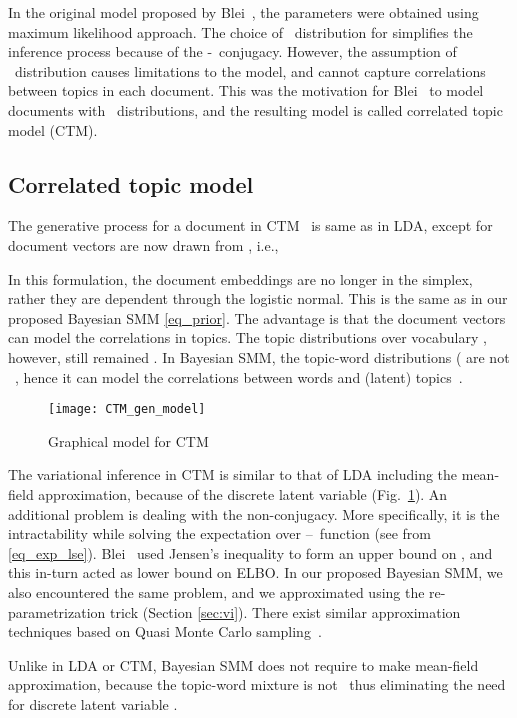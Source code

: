 \documentclass[journal]{IEEEtran}
\newcommand{\lse}{--}      \newcommand{\Dir}{}
\newcommand{\Dis}{}
\newcommand{\Mul}{}
\newcommand{\Gau}{}
\begin{document}
In the original model proposed by Blei~\cite{Blei:2003:LDA}, the parameters  were obtained using maximum likelihood approach. The choice of \Dir~distribution for   simplifies the inference process because of the \Dir-\Mul~conjugacy. However, the assumption of \Dir~distribution causes limitations to the model, and  cannot capture correlations between topics in each document.
This was the motivation for Blei~\cite{Blei:2005:CTM} to model documents with \Gau~distributions, and the resulting model is called correlated topic model (CTM).

\subsection{Correlated topic model}
The generative process for a document in CTM~\cite{Blei:2005:CTM} is same as in 
LDA, except for document vectors are now drawn from \Gau, i.e.,

In this formulation, the document embeddings  are no longer in the 
 simplex, rather they are dependent through the logistic normal. This 
is the same as in our proposed Bayesian SMM \eqref{eq_prior}. The advantage is 
that the document vectors can model the correlations in topics. The topic 
distributions over vocabulary , however, still remained \Dis.
In Bayesian SMM, the topic-word distributions ( are not \Dis~, hence 
it can model the correlations between words and (latent) 
topics~\cite{Blei:2005:CTM}.
\begin{figure}[t!]
	\centering
	\texttt{[image: CTM\_gen\_model]}
	\caption{Graphical model for CTM} \label{fig:ctm}
\end{figure}


The variational inference in CTM is similar to that of LDA including the 
mean-field approximation, because of the discrete latent variable  
(Fig.~\ref{fig:ctm}). An additional problem is dealing with the non-conjugacy. 
More specifically, it is the intractability while solving the expectation over 
\lse~function (see  from \eqref{eq_exp_lse}). 
Blei~\cite{Blei:2005:CTM} used Jensen's inequality to form an upper bound on 
, and this in-turn acted as lower bound on ELBO. In our proposed 
Bayesian SMM, we also encountered the same problem, and we approximated 
 using  the re-parametrization trick (Section \ref{sec:vi}). 
There exist similar approximation techniques based on Quasi Monte Carlo 
sampling~\cite{Depraetere:2017:mixed}.



Unlike in LDA or CTM, Bayesian SMM does not require to make mean-field approximation, because the topic-word mixture is not \Dis~thus eliminating the need for discrete latent variable .
\end{document}
